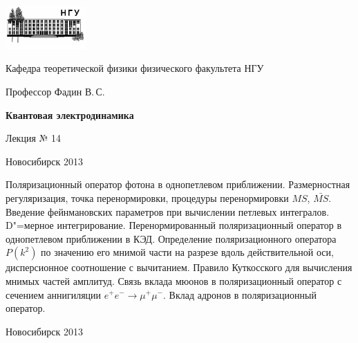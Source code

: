 \documentclass[12pt,pagesize,paper=192mm:108mm]{scrbook}
\begin{document}
\begin{titlepage}
  \vspace*{-1em}
  \begin{center}
    \includegraphics[width=0.23\textwidth]{../NSU-logo}

    Кафедра теоретической физики физического факультета НГУ
    \medskip

    \Large
    Профессор Фадин В.\,С.
    \bigskip

    \huge
    \textbf{Квантовая электродинамика}
    \bigskip

    \Large
    Лекция № 14
    \vfill

    \normalsize
    \vfill

    \normalsize \ccbysa\hspace{0.5em}  Новосибирск 2013
  \end{center}
\end{titlepage}
\vspace*{-1em}
\begin{center}
\vfill
  \begin{minipage}{0.65\linewidth}
    Поляризационный оператор фотона в однопетлевом
    приближении. Размерностная регуляризация, точка перенормировки,
    процедуры перенормировки $MS$, $\bar{MS}$.  Введение фейнмановских
    параметров при вычислении петлевых интегралов. D"=мерное
    интегрирование. Перенормированный поляризационный оператор в
    однопетлевом приближении в КЭД. Определение поляризационного
    оператора $P(k^2)$ по значению его мнимой части на разрезе вдоль
    действительной оси, дисперсионное соотношение с вычитанием.
    Правило Куткосского для вычисления мнимых частей амплитуд. Связь
    вклада мюонов в поляризационный оператор с сечением аннигиляции
    $e^+e^- \to \mu^+\mu^-$. Вклад адронов в поляризационный оператор.
  \end{minipage}
  \vfill

  \normalsize \ccbysa\hspace{0.5em} Новосибирск 2013
\end{center}
\end{document}
